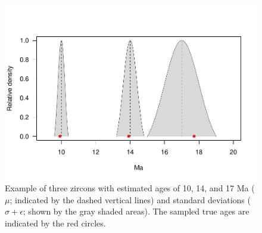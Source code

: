 \documentclass[12pt,letterpaper]{article}
\begin{document}
\begin{figure}[h!]
\centering
\includegraphics[width=120mm]{figs/ZirconAge.pdf}
\caption{Example of three zircons with estimated ages of 10, 14, and 17 Ma ($\mu$; indicated by the dashed vertical lines) and standard deviations ($\sigma + \epsilon$; shown by the gray shaded areas). The sampled true ages are indicated by the red circles. }
\label{f_zir_age}
\end{figure}
\end{document}
